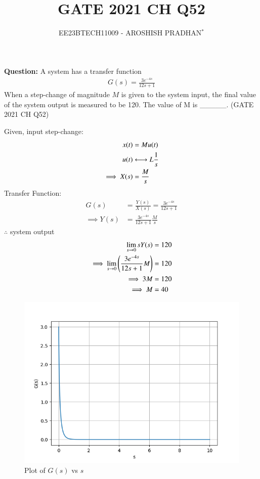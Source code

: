 \documentclass[journal,12pt,twocolumn]{IEEEtran}
\theoremstyle{remark}
\begin{document}

\vspace{3cm}

\title{GATE 2021 CH Q52}
\author{EE23BTECH11009 - AROSHISH PRADHAN$^{*}$%
}
\maketitle
\newpage
\bigskip
\textbf{Question:} A system has a transfer function
\begin{align}
    G(s) = \frac{3e^{-4s}}{12s + 1}\nonumber
\end{align}
When a step-change of magnitude $M$ is given to the system input, the final value of the system output is measured to be 120. The value of M is \_\_\_\_\_.
\hfill(GATE 2021 CH Q52)\\
\solution
\fi


Given, input step-change:
\begin{align}
    x(t) &= Mu(t)\\
    u(t) &\system{L} \frac{1}{s}\\
    \implies X(s) &= \frac{M}{s}
\end{align}
Transfer Function:
\begin{align}
    G(s) &= \frac{Y(s)}{X(s)} = \frac{3e^{-4s}}{12s + 1}\\
    \implies Y(s) &= \frac{3e^{-4s}}{12s + 1}\frac{M}{s}
\end{align}
$\therefore$ system output
\begin{align}
     \lim_{s\rightarrow0}sY(s) &= 120\\
    \implies \lim_{s\rightarrow0}\left(\frac{3e^{-4s}}{12s + 1}M\right) &= 120\\
    \implies 3M &= 120\\
    \implies M &= 40
\end{align}

\begin{figure}
    \centering
    \includegraphics[width = \columnwidth]{2021/CH/52/figs/assign9.png}
	\caption{Plot of $G(s)$ vs $s$}
    \label{fig:1_gate.21.ch.52}
\end{figure}
\end{document}
